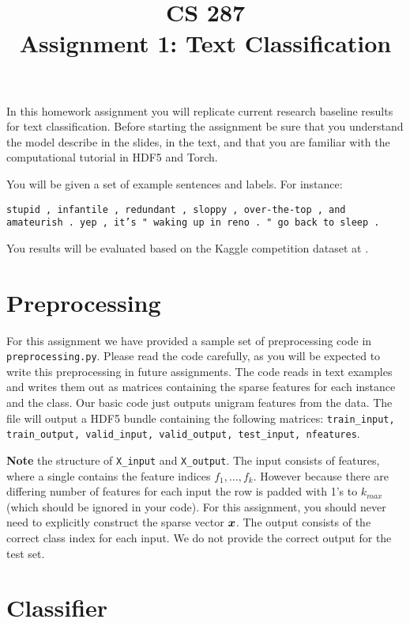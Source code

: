 \documentclass[11pt]{article}
\title{CS 287 \\ Assignment 1: Text Classification }
\date{}
\begin{document}
\maketitle{}

In this homework assignment you will replicate current
research baseline results for text classification. Before 
starting the assignment be sure that you understand the model 
describe in the slides, in the text, and that you are familiar 
with the computational tutorial in HDF5 and Torch. 


You will be given a set of example sentences and labels. For instance: 


\vspace{0.5cm}

\noindent
\texttt{stupid , infantile , redundant , sloppy , over-the-top , and amateurish . yep , it's " waking up in reno . " go back to sleep . }

You results will be evaluated based on the Kaggle competition dataset at \url{}.

\section{Preprocessing}

For this assignment we have provided a sample set of preprocessing
code in \texttt{preprocessing.py}. Please read the code carefully, as
you will be expected to write this preprocessing in future
assignments.  The code reads in text examples and writes them out as
matrices containing the sparse features for each instance and the
class. Our basic code just outputs unigram features from the data.
The file will output a HDF5 bundle containing the following matrices:
\texttt{train\_input, train\_output, valid\_input, valid\_output, test\_input, nfeatures}.

\textbf{Note} the structure of \texttt{X\_input} and
\texttt{X\_output}. The input consists of features, where a single
contains the feature indices $f_1, \ldots, f_k$. However because there
are differing number of features for each input the row is padded with
1's to $k_{max}$ (which should be ignored in your code).  For this
assignment, you should never need to explicitly construct the sparse
vector $\boldsymbol{x}$. The output consists of the correct class index for
each input. We do not provide the correct output for the test set.

\section{Classifier}
\end{document}
